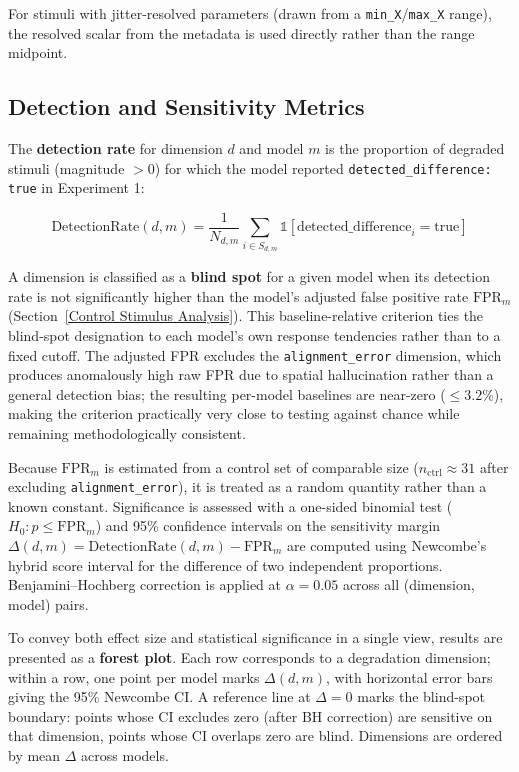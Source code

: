 For stimuli with jitter-resolved parameters (drawn from a \texttt{min\_X}/\texttt{max\_X} range), the resolved scalar from the metadata is used directly rather than the range midpoint.

\subsection{Detection and Sensitivity Metrics} \label{Detection and Sensitivity Metrics}

The \textbf{detection rate} for dimension $d$ and model $m$ is the proportion of degraded stimuli (magnitude $> 0$) for which the model reported \texttt{detected\_difference: true} in Experiment 1:

\[\text{DetectionRate}(d, m) = \frac{1}{N_{d,m}} \sum_{i \in S_{d,m}} \mathbb{1}[\text{detected\_difference}_{i} = \text{true}]\]

A dimension is classified as a \textbf{blind spot} for a given model when its detection rate is not significantly higher than the model's adjusted false positive rate $\text{FPR}_m$ (Section~\ref{Control Stimulus Analysis}). This baseline-relative criterion ties the blind-spot designation to each model's own response tendencies rather than to a fixed cutoff. The adjusted FPR excludes the \texttt{alignment\_error} dimension, which produces anomalously high raw FPR due to spatial hallucination rather than a general detection bias; the resulting per-model baselines are near-zero ($\leq 3.2\%$), making the criterion practically very close to testing against chance while remaining methodologically consistent.

Because $\text{FPR}_m$ is estimated from a control set of comparable size ($n_{\text{ctrl}} \approx 31$ after excluding \texttt{alignment\_error}), it is treated as a random quantity rather than a known constant. Significance is assessed with a one-sided binomial test ($H_0\colon p \leq \text{FPR}_m$) and 95\% confidence intervals on the sensitivity margin $\Delta(d, m) = \text{DetectionRate}(d, m) - \text{FPR}_m$ are computed using Newcombe's hybrid score interval for the difference of two independent proportions. Benjamini--Hochberg correction is applied at $\alpha = 0.05$ across all (dimension, model) pairs.

To convey both effect size and statistical significance in a single view, results are presented as a \textbf{forest plot}. Each row corresponds to a degradation dimension; within a row, one point per model marks $\Delta(d, m)$, with horizontal error bars giving the 95\% Newcombe CI. A reference line at $\Delta = 0$ marks the blind-spot boundary: points whose CI excludes zero (after BH correction) are sensitive on that dimension, points whose CI overlaps zero are blind. Dimensions are ordered by mean $\Delta$ across models.

